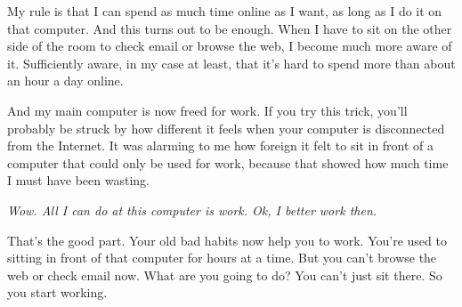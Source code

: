 My rule is that I can spend as
                  much time online as I want, as long as I do it on that
                  computer. And this turns out to be enough. When I have to sit
                  on the other side of the room to check email or browse the
                  web, I become much more aware of it. Sufficiently aware, in my
                  case at least, that it's hard to spend more than about an hour
                  a day online.

And my main computer is now freed for
                  work. If you try this trick, you'll probably be struck by how
                  different it feels when your computer is disconnected from the
                  Internet. It was alarming to me how foreign it felt to sit in
                  front of a computer that could only be used for work, because
                  that showed how much time I must have been wasting.

\emph{Wow. All I can do at this computer is work. Ok, I better
                    work then.}

That's the good part. Your old bad habits now
                  help you to work. You're used to sitting in front of that
                  computer for hours at a time. But you can't browse the web or
                  check email now. What are you going to do? You can't just sit
                  there. So you start working.


              
            
          
